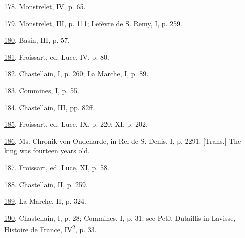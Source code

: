 \protect\hypertarget{23_NOTES.xhtmlux5cux23id_1581}{\protect\hyperlink{10_Chapter_Three__THE_HEROIC_DREAM.xhtmlux5cux23id_1580}{178}}.
Monstrelet, IV, p. 65.

\protect\hypertarget{23_NOTES.xhtmlux5cux23id_1579}{\protect\hyperlink{10_Chapter_Three__THE_HEROIC_DREAM.xhtmlux5cux23id_1578}{179}}.
Monstrelet, III, p. 111; Lefèvre de S. Remy, I, p. 259.

\protect\hypertarget{23_NOTES.xhtmlux5cux23id_1577}{\protect\hyperlink{10_Chapter_Three__THE_HEROIC_DREAM.xhtmlux5cux23id_1576}{180}}.
Basin, III, p. 57.

\protect\hypertarget{23_NOTES.xhtmlux5cux23id_1575}{\protect\hyperlink{10_Chapter_Three__THE_HEROIC_DREAM.xhtmlux5cux23id_1574}{181}}.
Froissart, ed. Luce, IV, p. 80.

\protect\hypertarget{23_NOTES.xhtmlux5cux23id_1573}{\protect\hyperlink{10_Chapter_Three__THE_HEROIC_DREAM.xhtmlux5cux23id_1572}{182}}.
Chastellain, I, p. 260; La Marche, I, p. 89.

\protect\hypertarget{23_NOTES.xhtmlux5cux23id_1571}{\protect\hyperlink{10_Chapter_Three__THE_HEROIC_DREAM.xhtmlux5cux23id_1570}{183}}.
Commines, I, p. 55.

\protect\hypertarget{23_NOTES.xhtmlux5cux23id_1569}{\protect\hyperlink{10_Chapter_Three__THE_HEROIC_DREAM.xhtmlux5cux23id_1568}{184}}.
Chastellain, III, pp. 82ff.

\protect\hypertarget{23_NOTES.xhtmlux5cux23id_1567}{\protect\hyperlink{10_Chapter_Three__THE_HEROIC_DREAM.xhtmlux5cux23id_1566}{185}}.
Froissart, ed. Luce, IX, p. 220; XI, p. 202.

\protect\hypertarget{23_NOTES.xhtmlux5cux23id_1565}{\protect\hyperlink{10_Chapter_Three__THE_HEROIC_DREAM.xhtmlux5cux23id_1564}{186}}.
Ms. Chronik von Oudenarde, in Rel de S. Denis, I, p. 2291. {[}Trans.{]}
The king was fourteen years old.

\protect\hypertarget{23_NOTES.xhtmlux5cux23id_1563}{\protect\hyperlink{10_Chapter_Three__THE_HEROIC_DREAM.xhtmlux5cux23id_1562}{187}}.
Froissart, ed. Luce, XI, p. 58.

\protect\hypertarget{23_NOTES.xhtmlux5cux23id_1561}{\protect\hyperlink{10_Chapter_Three__THE_HEROIC_DREAM.xhtmlux5cux23id_1560}{188}}.
Chastellain, II, p. 259.

\protect\hypertarget{23_NOTES.xhtmlux5cux23page_411}{\protect\hyperlink{10_Chapter_Three__THE_HEROIC_DREAM.xhtmlux5cux23id_1559}{189}}.
La Marche, II, p. 324.

\protect\hypertarget{23_NOTES.xhtmlux5cux23id_1558}{\protect\hyperlink{10_Chapter_Three__THE_HEROIC_DREAM.xhtmlux5cux23id_1557}{190}}.
Chastellain, I, p. 28; Commines, I, p. 31; see Petit Dutaillis in
Lavisse, Histoire de France, IV\textsuperscript{2}, p. 33.

